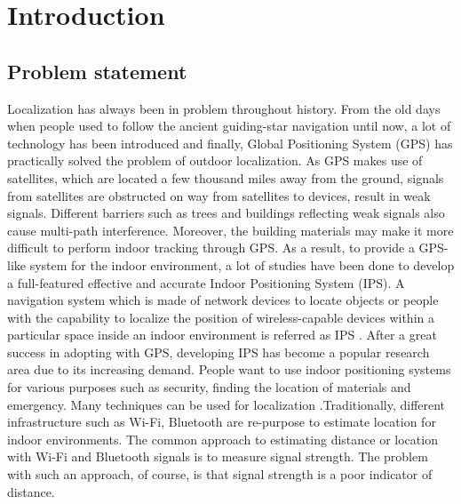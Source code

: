 \documentclass[\main/main.tex]{subfiles}
\begin{document}
\graphicspath{{img/}{01_intro/img/}}

\chapter{Introduction}

\section{Problem statement}
Localization has always been in problem throughout history. From the old days when people used to follow the ancient guiding-star navigation until now, a lot of technology has been introduced and finally, Global Positioning System (GPS) has practically solved the problem of outdoor localization. As GPS makes use of satellites, which are located a few thousand miles away from the ground, signals from satellites are obstructed on way from satellites to devices, result in weak signals. Different barriers such as trees and buildings reflecting weak signals also cause multi-path interference. Moreover, the building materials may make it more difficult to perform indoor tracking through GPS. As a result, to provide a GPS-like system for the indoor environment, a lot of studies have been done to develop a full-featured effective and accurate Indoor Positioning System (IPS).
\newline\newline
A navigation system which is made of network devices to locate objects or people with the capability to localize the position of wireless-capable devices within a particular space inside an indoor environment is referred as IPS \cite{survey_on_indoor_wireless_positioning_techniques}. After a great success in adopting with GPS, developing IPS has become a popular research area due to its increasing demand. People want to use indoor positioning systems for various purposes such as security, finding the location of materials and emergency. 
\newline\newline
Many techniques can be used for localization \cite{a_survey_on_localization_for_mobile_wireless_sensor_networks}.Traditionally, different infrastructure such as Wi-Fi, Bluetooth are re-purpose to estimate location for indoor environments. The common approach to estimating distance or location with Wi-Fi and Bluetooth signals is to measure signal strength. The problem with such an approach, of course, is that signal strength is a poor indicator of distance.
\newline\newline
\end{document}
